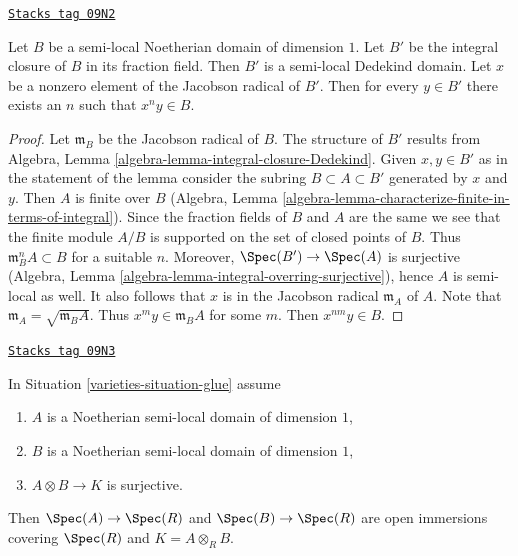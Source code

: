 \begin{lemma}
\label{varieties-lemma-semi-local-dimension-one-conductor}
\href{https://stacks.math.columbia.edu/tag/09N2}{\texttt{Stacks tag 09N2}}

Let $B$ be a semi-local Noetherian domain of dimension $1$.
Let $B'$ be the integral closure of $B$ in its fraction field.
Then $B'$ is a semi-local Dedekind domain.
Let $x$ be a nonzero element of the Jacobson radical of $B'$.
Then for every $y \in B'$ there exists an $n$ such that
$x^n y \in B$.
\end{lemma}

\begin{proof}
Let $\mathfrak m_B$ be the Jacobson radical of $B$.
The structure of $B'$ results from
Algebra, Lemma \ref{algebra-lemma-integral-closure-Dedekind}.
Given $x, y \in B'$ as in the statement of the lemma consider
the subring $B \subset A \subset B'$ generated by $x$ and $y$.
Then $A$ is finite over $B$ (Algebra, Lemma
\ref{algebra-lemma-characterize-finite-in-terms-of-integral}).
Since the fraction fields of $B$ and $A$ are the same we see
that the finite module $A/B$ is supported on the set of
closed points of $B$. Thus $\mathfrak m_B^n A \subset B$ for
a suitable $n$. Moreover, $\Spec(B') \to \Spec(A)$ is
surjective (Algebra, Lemma \ref{algebra-lemma-integral-overring-surjective}),
hence $A$ is semi-local as well. It also follows that
$x$ is in the Jacobson radical $\mathfrak m_A$ of $A$. Note that
$\mathfrak m_A = \sqrt{\mathfrak m_B A}$.
Thus $x^m y \in \mathfrak m_B A$ for some $m$.
Then $x^{nm} y \in B$.
\end{proof}

\begin{lemma}
\label{varieties-lemma-semi-local-both-side}
\href{https://stacks.math.columbia.edu/tag/09N3}{\texttt{Stacks tag 09N3}}

In Situation \ref{varieties-situation-glue} assume
\begin{enumerate}
\item $A$ is a Noetherian semi-local domain of dimension $1$,
\item $B$ is a Noetherian semi-local domain of dimension $1$,
\item $A \otimes B \to K$ is surjective.
\end{enumerate}
Then $\Spec(A) \to \Spec(R)$ and $\Spec(B) \to \Spec(R)$
are open immersions covering $\Spec(R)$ and $K = A \otimes_R B$.
\end{lemma}

